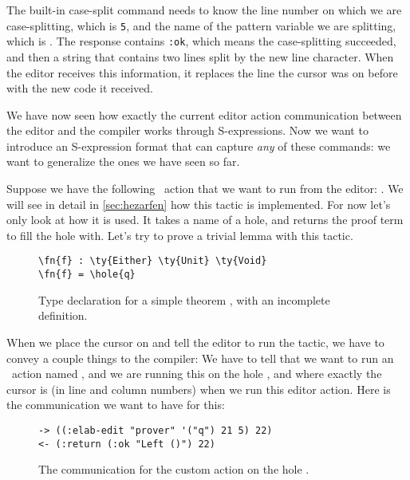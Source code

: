 The built-in case-split command needs to know the line number on which we are
case-splitting, which is \texttt{5}, and the name of the pattern variable we are
splitting, which is .  The response contains \texttt{:ok}, which means
the case-splitting succeeded, and then a string that contains two lines split
by the new line character. When the editor receives this information, it
replaces the line the cursor was on before with the new code it received.

We have now seen how exactly the current editor action communication between
the editor and the compiler works through S-expressions.
Now we want to introduce an S-expression format that can capture \emph{any} of
these commands: we want to generalize the ones we have seen so far.

Suppose we have the following \Elab\ action that we want to run from the editor:
.
We will see in detail in \autoref{sec:hezarfen} how this tactic is
implemented. For now let's only look at how it is used. It takes a name of a
hole, and returns the proof term to fill the hole with.
Let's try to prove a trivial lemma with this tactic.

\begin{figure}[ht]
\caption{Type declaration for a simple theorem , with an incomplete definition.}
\begin{Verbatim}[framesep=2mm, label=\footnotesize{\normalfont{Idris}}, labelposition=topline]
\fn{f} : \ty{Either} \ty{Unit} \ty{Void}
\fn{f} = \hole{q}
\end{Verbatim}
\end{figure}

When we place the cursor on  and tell the editor to run the 
tactic, we have to convey a couple things to the compiler: We have to tell that
we want to run an \Elab\ action named , and we are running this on
the hole , and where exactly the cursor is (in line and column numbers)
when we run this editor action. Here is the communication we want to have for this:

\begin{figure}[ht]
\caption{The communication for the custom  action on the hole .}
\begin{Verbatim}[framesep=2mm, label=\footnotesize{\normalfont{S-expression}}, labelposition=topline]
-> ((:elab-edit "prover" '("q") 21 5) 22)
<- (:return (:ok "Left ()") 22)
\end{Verbatim}
\end{figure}

